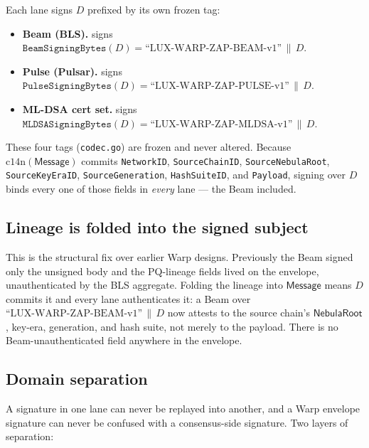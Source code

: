 Each lane signs $D$ prefixed by its own frozen tag:

\begin{itemize}[leftmargin=2em,nosep]
  \item \textbf{Beam (BLS).} signs $\texttt{BeamSigningBytes}(D) = \text{``LUX-WARP-ZAP-BEAM-v1''} \,\|\, D$.
  \item \textbf{Pulse (Pulsar).} signs $\texttt{PulseSigningBytes}(D) = \text{``LUX-WARP-ZAP-PULSE-v1''} \,\|\, D$.
  \item \textbf{ML-DSA cert set.} signs $\texttt{MLDSASigningBytes}(D) = \text{``LUX-WARP-ZAP-MLDSA-v1''} \,\|\, D$.
\end{itemize}

These four tags (\texttt{codec.go}) are frozen and never altered. Because $\mathrm{c14n}(\mathsf{Message})$ commits \texttt{NetworkID}, \texttt{SourceChainID}, \texttt{SourceNebulaRoot}, \texttt{SourceKeyEraID}, \texttt{SourceGeneration}, \texttt{HashSuiteID}, and \texttt{Payload}, signing over $D$ binds every one of those fields in \emph{every} lane --- the Beam included.

\subsection{Lineage is folded into the signed subject}

This is the structural fix over earlier Warp designs. Previously the Beam signed only the unsigned body and the PQ-lineage fields lived on the envelope, unauthenticated by the BLS aggregate. Folding the lineage into $\mathsf{Message}$ means $D$ commits it and every lane authenticates it: a Beam over $\text{``LUX-WARP-ZAP-BEAM-v1''}\,\|\,D$ now attests to the source chain's $\mathsf{NebulaRoot}$, key-era, generation, and hash suite, not merely to the payload. There is no Beam-unauthenticated field anywhere in the envelope.

\subsection{Domain separation}

A signature in one lane can never be replayed into another, and a Warp envelope signature can never be confused with a consensus-side signature. Two layers of separation:

